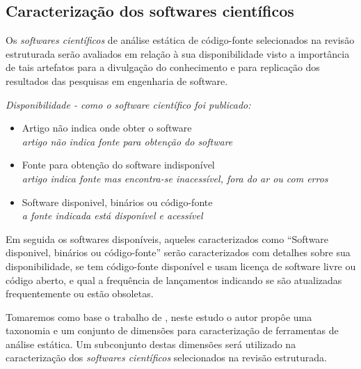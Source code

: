 \subsection{Caracterização dos softwares científicos}
\label{caracterizacao}

Os {\it softwares científicos} de análise estática de código-fonte selecionados
na revisão estruturada serão avaliados em relação à sua
disponibilidade visto a importância de tais artefatos para a divulgação do
conhecimento e para replicação dos resultados das pesquisas em engenharia de
software.


\begin{description}

  \item {\it Disponibilidade - como o software científico foi publicado:}
    \begin{itemize}
      \item Artigo não indica onde obter o software\\
        {\it \small artigo não indica fonte para obtenção do software}
      \item Fonte para obtenção do software indisponível\\
        {\it \small artigo indica fonte mas encontra-se inacessível, fora do ar ou com erros}
      \item Software disponivel, binários ou código-fonte\\
        {\it \small a fonte indicada está disponível e acessível}
    \end{itemize}

\end{description}

Em seguida os softwares disponíveis, aqueles caracterizados como ``Software
disponivel, binários ou código-fonte'' serão caracterizados com detalhes sobre
sua disponibilidade, se tem código-fonte disponível e usam licença de software
livre ou código aberto, e qual a frequência de lançamentos indicando se são
atualizadas frequentemente ou estão obsoletas.

Tomaremos como base o trabalho de , neste estudo o autor
propôe uma taxonomia e um conjunto de dimensões para caracterização de
ferramentas de análise estática. Um subconjunto destas dimensões será utilizado
na caracterização dos {\it softwares científicos} selecionados na revisão
estruturada.

